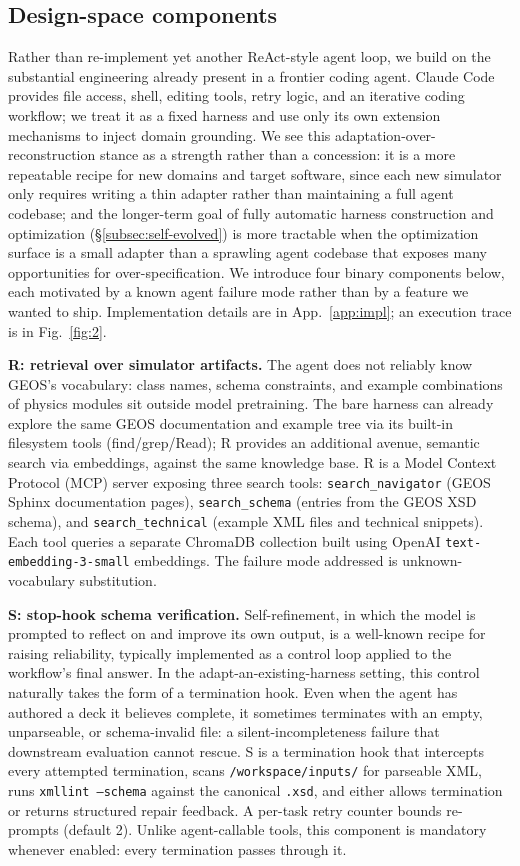 \documentclass{article}
\begin{document}
\subsection{Design-space components}
\label{subsec:overview}

Rather than re-implement yet another ReAct-style agent loop, we build on the substantial engineering already present in a frontier coding agent. Claude Code provides file access, shell, editing tools, retry logic, and an iterative coding workflow; we treat it as a fixed harness and use only its own extension mechanisms to inject domain grounding. We see this adaptation-over-reconstruction stance as a strength rather than a concession: it is a more repeatable recipe for new domains and target software, since each new simulator only requires writing a thin adapter rather than maintaining a full agent codebase; and the longer-term goal of fully automatic harness construction and optimization (\S\ref{subsec:self-evolved}) is more tractable when the optimization surface is a small adapter than a sprawling agent codebase that exposes many opportunities for over-specification. We introduce four binary components below, each motivated by a known agent failure mode rather than by a feature we wanted to ship. Implementation details are in App.~\ref{app:impl}; an execution trace is in Fig.~\ref{fig:2}.

\textbf{R: retrieval over simulator artifacts.} The agent does not reliably know GEOS's vocabulary: class names, schema constraints, and example combinations of physics modules sit outside model pretraining. The bare harness can already explore the same GEOS documentation and example tree via its built-in filesystem tools (find/grep/Read); R provides an additional avenue, semantic search via embeddings, against the same knowledge base. R is a Model Context Protocol (MCP) server exposing three search tools: \texttt{search\_navigator} (GEOS Sphinx documentation pages), \texttt{search\_schema} (entries from the GEOS XSD schema), and \texttt{search\_technical} (example XML files and technical snippets). Each tool queries a separate ChromaDB collection built using OpenAI \texttt{text-embedding-3-small} embeddings. The failure mode addressed is unknown-vocabulary substitution.

\textbf{S: stop-hook schema verification.} Self-refinement, in which the model is prompted to reflect on and improve its own output, is a well-known recipe for raising reliability, typically implemented as a control loop applied to the workflow's final answer. In the adapt-an-existing-harness setting, this control naturally takes the form of a termination hook. Even when the agent has authored a deck it believes complete, it sometimes terminates with an empty, unparseable, or schema-invalid file: a silent-incompleteness failure that downstream evaluation cannot rescue. S is a termination hook that intercepts every attempted termination, scans \texttt{/workspace/inputs/} for parseable XML, runs \texttt{xmllint --schema} against the canonical \texttt{.xsd}, and either allows termination or returns structured repair feedback. A per-task retry counter bounds re-prompts (default 2). Unlike agent-callable tools, this component is mandatory whenever enabled: every termination passes through it.
\end{document}
